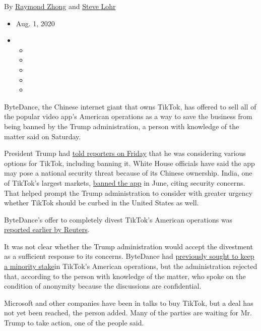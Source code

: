 By \href{https://www.nytimes3xbfgragh.onion/by/raymond-zhong}{Raymond
Zhong} and \href{https://www.nytimes3xbfgragh.onion/by/steve-lohr}{Steve
Lohr}

\begin{itemize}
\item
  Aug. 1, 2020
\item
  \begin{itemize}
  \item
  \item
  \item
  \item
  \item
  \end{itemize}
\end{itemize}

ByteDance, the Chinese internet giant that owns TikTok, has offered to
sell all of the popular video app's American operations as a way to save
the business from being banned by the Trump administration, a person
with knowledge of the matter said on Saturday.

President Trump had
\href{https://www.nytimes3xbfgragh.onion/2020/07/31/technology/tiktok-microsoft.html}{told
reporters on Friday} that he was considering various options for TikTok,
including banning it. White House officials have said the app may pose a
national security threat because of its Chinese ownership. India, one of
TikTok's largest markets,
\href{https://www.nytimes3xbfgragh.onion/2020/06/30/technology/india-china-tiktok.html}{banned
the app} in June, citing security concerns. That helped prompt the Trump
administration to consider with greater urgency whether TikTok should be
curbed in the United States as well.

ByteDance's offer to completely divest TikTok's American operations was
\href{https://www.reuters.com/article/us-usa-tiktok-bytedance-exclusive-idUSKBN24X3SK}{reported
earlier by Reuters}.

It was not clear whether the Trump administration would accept the
divestment as a sufficient response to its concerns. ByteDance had
\href{https://www.nytimes3xbfgragh.onion/2020/07/23/business/dealbook/tiktok-bytedance-investors-trump.html?searchResultPosition=2}{previously
sought to keep a minority stake}in TikTok's American operations, but the
administration rejected that, according to the person with knowledge of
the matter, who spoke on the condition of anonymity because the
discussions are confidential.

Microsoft and other companies have been in talks to buy TikTok, but a
deal has not yet been reached, the person added. Many of the parties are
waiting for Mr. Trump to take action, one of the people said.

